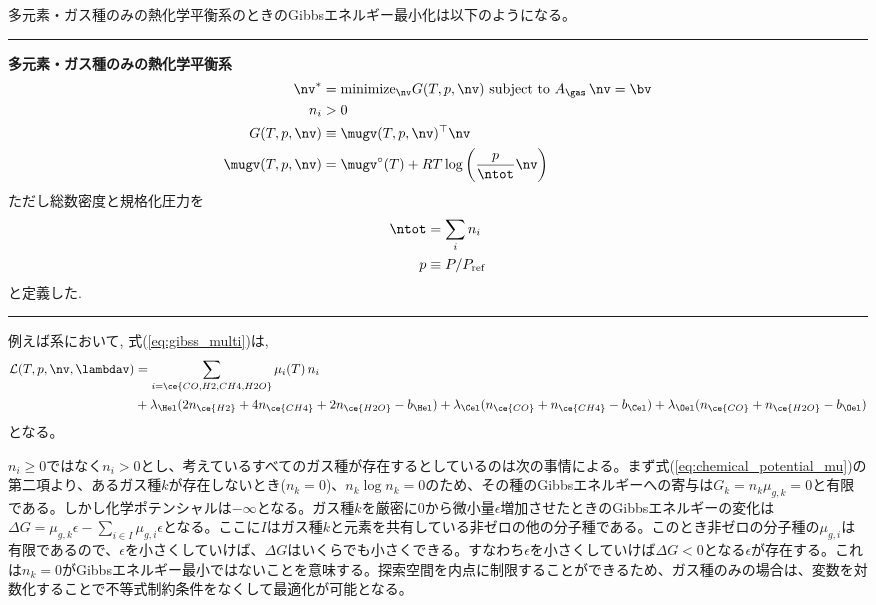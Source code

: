 多元素・ガス種のみの熱化学平衡系のときのGibbsエネルギー最小化は以下のようになる。
\noindent\rule{\textwidth}{0.4pt}
\textbf{\large 多元素・ガス種のみの熱化学平衡系}  \\
\begin{align}
\label{eq:gibss_multi}
    \nv^\ast &= \mathrm{minimize}_{\nv} G(T, p, \nv) \,\, \mbox{subject to} \,\, A_\gas \, \nv = \bv \\
    n_i &> 0\\
    G(T, p, \nv) &\equiv  \mugv (T, p, \nv)^\top \nv\\ 
    \label{eq:chemical_potential_mu}
    \mugv (T, p, \nv) &=  \mugv^\circ(T) + RT \log{\left(\frac{p}{\ntot} \nv\right)} 
\end{align}
ただし総数密度と規格化圧力を
\begin{align}
\label{eq:ntot_tce}
    \ntot &= \sum_i n_i \\
    p &\equiv P/P_\mathrm{ref}
\end{align}
と定義した. \\
\noindent\rule{\textwidth}{0.4pt}
例えば系において, 式(\ref{eq:gibss_multi})は,
\begin{align}
    \mathcal{L}(T, p, \nv,\lambdav) &= \sum_{i = \ce{CO, H2, CH4, H2O}} \mu_i (T) \, n_i \nonumber \\ &+ \lambda_{\Hel} (2 n_{\ce{H2}} + 4 n_{\ce{CH4}} + 2 n_{\ce{H2O}} - b_\Hel) 
    + \lambda_{\Cel} (n_{\ce{CO}} + n_{\ce{CH4}} - b_\Cel) +  \lambda_{\Oel} ( n_{\ce{CO}} + n_{\ce{H2O}} - b_\Oel)
\end{align}
となる。

$n_i \ge 0$ではなく$n_i > 0$とし、考えているすべてのガス種が存在するとしているのは次の事情による。まず式(\ref{eq:chemical_potential_mu})の第二項より、あるガス種$k$が存在しないとき($n_k = 0$)、$n_k \log{n_k} = 0$のため、その種のGibbsエネルギーへの寄与は$G_k = n_k \mu_{g,k} = 0$と有限である。しかし化学ポテンシャルは$- \infty$となる。ガス種$k$を厳密に0から微小量$\epsilon$増加させたときのGibbsエネルギーの変化は$\Delta G = \mu_{g,k} \epsilon - \sum_{i \in I} \mu_{g,i} \epsilon $となる。ここに$I$はガス種$k$と元素を共有している非ゼロの他の分子種である。このとき非ゼロの分子種の$\mu_{g,i}$は有限であるので、$\epsilon$を小さくしていけば、$\Delta G$はいくらでも小さくできる。すなわち$\epsilon$を小さくしていけば$\Delta G < 0$となる$\epsilon$が存在する。これは$n_k = 0$がGibbsエネルギー最小ではないことを意味する。探索空間を内点に制限することができるため、ガス種のみの場合は、変数を対数化することで不等式制約条件をなくして最適化が可能となる。

